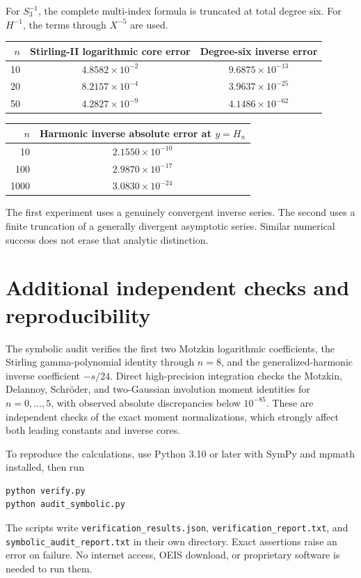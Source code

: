 \documentclass[11pt,openany]{book}
\numberwithin{equation}{chapter}
\theoremstyle{plain}
\theoremstyle{definition}
\theoremstyle{remark}
\begin{document}
For $S_3^{-1}$, the complete multi-index formula is truncated at total degree six. For $H^{-1}$, the terms through $X^{-5}$ are used.
\begin{center}
\begin{tabular}{rcc}
\toprule
$n$ & Stirling-II logarithmic core error & Degree-six inverse error\\\midrule
10 & $4.8582\times10^{-2}$ & $9.6875\times10^{-13}$\\
20 & $8.2157\times10^{-4}$ & $3.9637\times10^{-25}$\\
50 & $4.2827\times10^{-9}$ & $4.1486\times10^{-62}$\\\bottomrule
\end{tabular}
\end{center}
\begin{center}
\begin{tabular}{rc}
\toprule
$n$ & Harmonic inverse absolute error at $y=H_n$\\\midrule
10 & $2.1550\times10^{-10}$\\
100 & $2.9870\times10^{-17}$\\
1000 & $3.0830\times10^{-24}$\\\bottomrule
\end{tabular}
\end{center}
The first experiment uses a genuinely convergent inverse series. The second uses a finite truncation of a generally divergent asymptotic series. Similar numerical success does not erase that analytic distinction.

\section{Additional independent checks and reproducibility}

The symbolic audit verifies the first two Motzkin logarithmic coefficients, the Stirling gamma-polynomial identity through $n=8$, and the generalized-harmonic inverse coefficient $-s/24$. Direct high-precision integration checks the Motzkin, Delannoy, Schr\"oder, and two-Gaussian involution moment identities for $n=0,\ldots,5$, with observed absolute discrepancies below $10^{-85}$. These are independent checks of the exact moment normalizations, which strongly affect both leading constants and inverse cores.

To reproduce the calculations, use Python 3.10 or later with SymPy and mpmath installed, then run
\begin{lstlisting}
python verify.py
python audit_symbolic.py
\end{lstlisting}
The scripts write \nolinkurl{verification_results.json}, \nolinkurl{verification_report.txt}, and \nolinkurl{symbolic_audit_report.txt} in their own directory. Exact assertions raise an error on failure. No internet access, OEIS download, or proprietary software is needed to run them.
\end{document}
